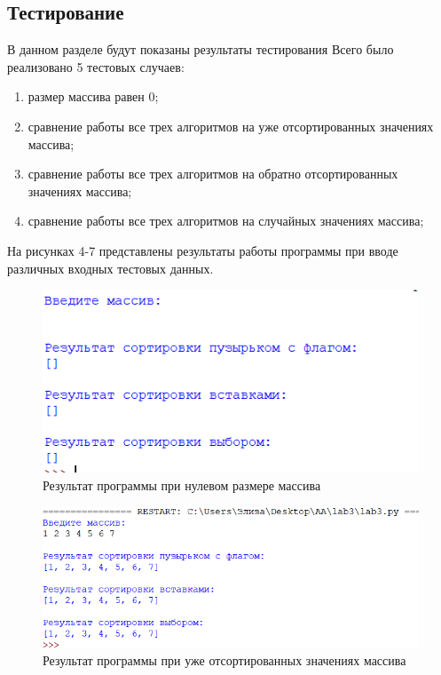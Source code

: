 \documentclass[a4paper,12pt]{article}
\begin{document}
	\subsection{Тестирование}
	\hfill
	
	В данном разделе будут показаны результаты тестирования
	Всего было реализовано 5 тестовых случаев:
	\begin{enumerate}
		\item размер массива равен 0;
		\item сравнение работы все трех алгоритмов на уже отсортированных
		значениях массива;
		\item сравнение работы все трех алгоритмов на обратно отсортированных
		значениях массива;
		\item сравнение работы все трех алгоритмов на случайных значениях массива;
	\end{enumerate}
	
	На рисунках 4-7 представлены результаты работы программы при вводе различных входных тестовых данных.
	
	\begin{figure}[H]
		\centering
		\includegraphics{res1.png}
		\captionsetup{justification=centering}
		\caption{Результат программы при нулевом размере массива}
		\label{Рис 4}
	\end{figure}

	\begin{figure}[H]
		\centering
		\includegraphics{res2.png}
		\captionsetup{justification=centering}
		\caption{Результат программы при уже отсортированных значениях массива}
		\label{Рис 5}
	\end{figure}
	
\end{document}
